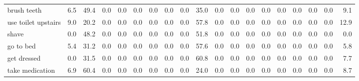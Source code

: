\documentclass{article}
\begin{document}
\begin{sideways}
\begin{tabular}{lrrrrrrrrrrrrrrrrrr}
brush teeth                   &         6.5 &               49.4 &           0.0 &                          0.0 &                0.0 &                0.0 &                        0.0 &          0.0 &             35.0 &                0.0 &                    0.0 &                      0.0 &                  0.0 &                   0.0 &              0.0 &              0.0 &                                  0.0 &          9.1 \\
use toilet upstairs           &         9.0 &               20.2 &           0.0 &                          0.0 &                0.0 &                0.0 &                        0.0 &          0.0 &             57.8 &                0.0 &                    0.0 &                      0.0 &                  0.0 &                   0.0 &              0.0 &              0.0 &                                  0.0 &         12.9 \\
shave                         &         0.0 &               48.2 &           0.0 &                          0.0 &                0.0 &                0.0 &                        0.0 &          0.0 &             51.8 &                0.0 &                    0.0 &                      0.0 &                  0.0 &                   0.0 &              0.0 &              0.0 &                                  0.0 &          0.0 \\
go to bed                     &         5.4 &               31.2 &           0.0 &                          0.0 &                0.0 &                0.0 &                        0.0 &          0.0 &             57.6 &                0.0 &                    0.0 &                      0.0 &                  0.0 &                   0.0 &              0.0 &              0.0 &                                  0.0 &          5.8 \\
get dressed                   &         0.0 &               31.5 &           0.0 &                          0.0 &                0.0 &                0.0 &                        0.0 &          0.0 &             60.8 &                0.0 &                    0.0 &                      0.0 &                  0.0 &                   0.0 &              0.0 &              0.0 &                                  0.0 &          7.7 \\
take medication               &         6.9 &               60.4 &           0.0 &                          0.0 &                0.0 &                0.0 &                        0.0 &          0.0 &             24.0 &                0.0 &                    0.0 &                      0.0 &                  0.0 &                   0.0 &              0.0 &              0.0 &                                  0.0 &          8.7 \\

\end{tabular}
\end{sideways}
\end{document}
